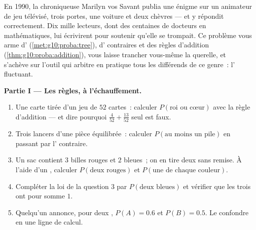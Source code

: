 \begin{problem}
\label{pb:g10:proba:1}
En 1990, la chroniqueuse Marilyn vos Savant publia une énigme sur un
animateur de jeu télévisé, trois portes, une voiture et deux chèvres
--- et y répondit correctement. Dix mille lecteurs, dont des
centaines de docteurs en mathématiques, lui écrivirent pour soutenir
qu'elle se trompait. Ce problème vous arme d'
(\cref{met:g10:proba:tree}), d' contraires et des règles
d'addition (\cref{thm:g10:proba:addition}), vous laisse trancher
vous-même la querelle, et s'achève sur l'outil qui arbitre en
pratique tous les différends de ce genre~: l' fluctuant.

\medskip
\noindent\textbf{Partie I --- Les règles, à l'échauffement.}
\begin{enumerate}
  \item Une carte tirée d'un jeu de $52$ cartes~: calculer
        $P(\text{roi ou cœur})$ avec la règle d'addition --- et dire
        pourquoi $\frac{4}{52} + \frac{13}{52}$ seul est faux.
  \item Trois lancers d'une pièce équilibrée~: calculer
        $P(\text{au moins un pile})$ en passant par l'
        contraire.
  \item Un sac contient $3$ billes rouges et $2$ bleues~; on en
        tire deux sans remise. À l'aide d'un , calculer
        $P(\text{deux rouges})$ et $P(\text{une de chaque
        couleur})$.
  \item Compléter la loi de la question 3 par
        $P(\text{deux bleues})$ et vérifier que les trois
         ont pour somme $1$.
  \item Quelqu'un annonce, pour deux 
        \emph{}, $P(A) = 0.6$ et $P(B) = 0.5$. Le
        confondre en une ligne de calcul.
\end{enumerate}


\end{problem}

